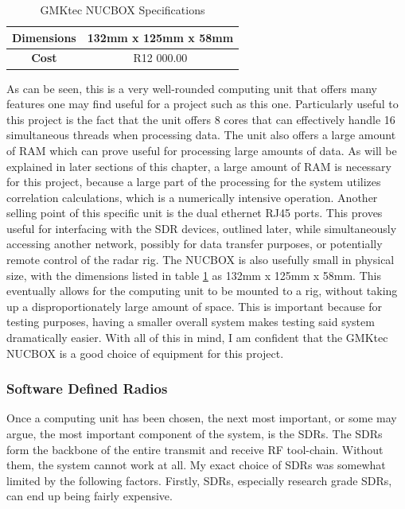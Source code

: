 \documentclass[11pt]{report}
\begin{document}
\begin{table}[H]
\begin{tabular}{|c|c|}
\textbf{Dimensions}     & 132mm x 125mm x 58mm   \\ \hline
\textbf{Cost}           & R12 000.00 \footnotemark                                                                                                                                                                                                      \\ \hline
\end{tabular}
\caption{GMKtec NUCBOX Specifications}
\label{tab:gmktec_nucbox_specs}
\end{table}

As can be seen, this is a very well-rounded computing unit that offers many features one may find useful for a project such as this one. Particularly useful to this project is the fact that the unit offers 8 cores that can effectively handle 16 simultaneous threads when processing data. The unit also offers a large amount of RAM which can prove useful for processing large amounts of data. As will be explained in later sections of this chapter, a large amount of RAM is necessary for this project, because a large part of the processing for the system utilizes correlation calculations, which is a numerically intensive operation. Another selling point of this specific unit is the dual ethernet RJ45 ports. This proves useful for interfacing with the SDR devices, outlined later, while simultaneously accessing another network, possibly for data transfer purposes, or potentially remote control of the radar rig. The NUCBOX is also usefully small in physical size, with the dimensions listed in table \ref{tab:gmktec_nucbox_specs} as 132mm x 125mm x 58mm. This eventually allows for the computing unit to be mounted to a rig, without taking up a disproportionately large amount of space. This is important because for testing purposes, having a smaller overall system makes testing said system dramatically easier. With all of this in mind, I am confident that the GMKtec NUCBOX is a good choice of equipment for this project.

\subsubsection{Software Defined Radios}
Once a computing unit has been chosen, the next most important, or some may argue, the most important component of the system, is the SDRs. The SDRs form the backbone of the entire transmit and receive RF tool-chain. Without them, the system cannot work at all. My exact choice of SDRs was somewhat limited by the following factors. Firstly, SDRs, especially research grade SDRs, can end up being fairly expensive. 
\end{document}
